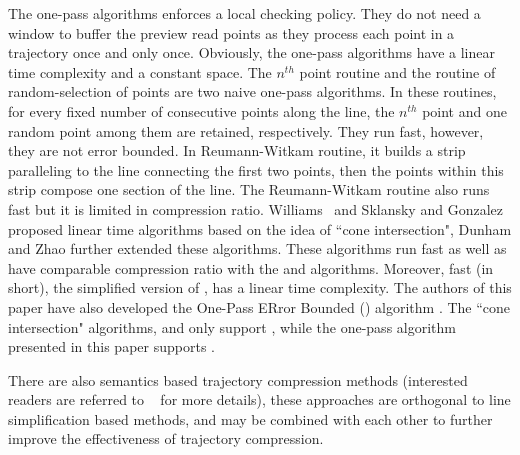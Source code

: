 The one-pass algorithms enforces a local checking policy.
They do not need a window to buffer the preview read points as they process each point in a trajectory once and only once.
Obviously, the one-pass algorithms have a linear time complexity and a constant space.
%
The $n^{th}$ point routine and the routine of random-selection of points \cite{Shi:Survey} are two naive one-pass algorithms.
In these routines, for every fixed number of consecutive points along the line, the $n^{th}$ point and one random point among them are retained, respectively.
They run fast, however, they are not error bounded.
%
In Reumann-Witkam routine\cite{Reumann:Strip}, it builds a strip paralleling to the line connecting the first two points, then the points within this strip compose one section of the line.
The Reumann-Witkam routine also runs fast but it is limited in compression ratio.
%
Williams~\cite{Williams:Longest} and Sklansky and Gonzalez \cite{Sklansky:Cone} proposed linear time algorithms based on the idea of ``cone intersection", Dunham \cite{Dunham:Cone} and Zhao \cite{Zhao:Sleeve} further extended these algorithms.
These algorithms run fast as well as have comparable compression ratio with the \dpa and \pavlidis algorithms.
%
Moreover, {fast \bqsa \cite{Liu:BQS} (\fbqsa in short), the simplified version of \bqsa, has a linear time complexity.}
%
The authors of this paper have also developed the One-Pass ERror Bounded (\operb) algorithm \cite{lin:operb}.
%
The ``cone intersection" algorithms, \fbqsa and \operb only support \ped,
while the one-pass algorithm presented in this paper supports \sed.



There are also semantics based trajectory compression methods (interested readers are referred to ~\cite{lin:operb} for more details), these approaches are orthogonal to line simplification based methods, and may be combined with each other to further improve the effectiveness of trajectory compression.

